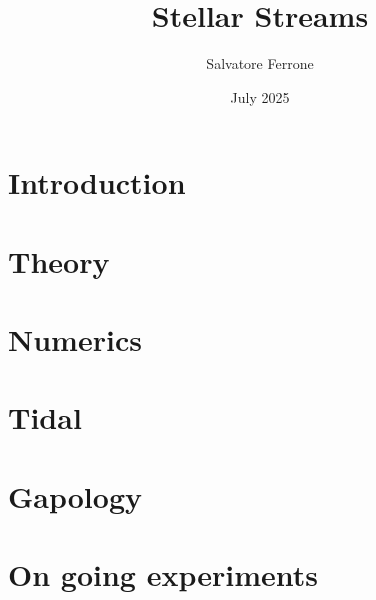 \documentclass[a4paper,12pt]{book}
\title{Stellar Streams}
\institute{PSL. Sapienza}
\author{Salvatore Ferrone}
\date{July 2025}
\begin{document}
\pslcover{}
\maketitle
\chapter{Introduction}


\chapter{Theory}


\chapter{Numerics}


\chapter{Tidal}


\chapter{Gapology}


\chapter{On going experiments}



\printbibliography
\end{document}
